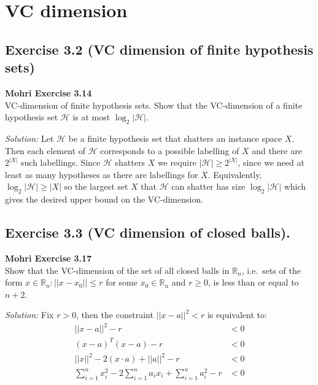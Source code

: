 \documentclass[
10pt, %
a4paper, %
oneside, %
headinclude,footinclude, %
BCOR5mm, %
]{scrartcl}
\newenvironment{problem}[2][]
               { \begin{mdframed}[backgroundcolor=gray!20] \textbf{#1 #2} \\}
               {  \end{mdframed}}
\newenvironment{solution}
               {\textit{Solution:}}
               {}
\begin{document}
\section{VC dimension}

\subsection*{Exercise 3.2 (VC dimension of finite hypothesis sets)}
\begin{problem}{Mohri Exercise 3.14}
VC-dimension of finite hypothesis sets. Show that the VC-dimension of a finite hypothesis set $\mathcal{H}$ is at most $\log_2|\mathcal{H}|$.
\end{problem}

\begin{solution}
  Let $\mathcal{H}$ be a finite hypothesis set that shatters an instance space $X$. Then each element of $\mathcal{H}$ corresponds to a possible labelling of $X$ and there are $2^{|X|}$ such labellings. Since $\mathcal{H}$ shatters $X$ we require $|\mathcal{H}| \geq 2^{|X|}$, since we need at least as many hypotheses as there are labellings for $X$. Equivalently, $\log_2{|\mathcal{H}|} \geq |X|$ so the largest set $X$ that $\mathcal{H}$ can shatter has size $\log_2 |\mathcal{H}|$ which gives the desired upper bound on the VC-dimension.
\end{solution}

\subsection*{Exercise 3.3 (VC dimension of closed balls).}
\begin{problem}{Mohri Exercise 3.17}
Show that the VC-dimension of the set of all closed balls in $\mathbb{R}_n$, i.e.\ sets of the form ${x \in \mathbb{R}_n : ||x-x_0|| \leq r}$ for some $x_0 \in \mathbb{R}_n$ and $r \geq 0$, is less than or equal to $n + 2$.
\end{problem}

\begin{solution}
Fix $r>0$, then the constraint $||x-a||^2<r$ is equivalent to:
\begin{align*}
  ||x-a||^2 - r &< 0 \\
  {(x-a)}^T(x-a) - r &< 0 \\
  ||x||^2 - 2(x\cdot a) + ||a||^2 - r &< 0 \\
  \sum_{i=1}^n x_i^2 - 2 \sum_{i=1}^n a_i x_i + \sum_{i=1}^n a_i^2 - r &< 0
\end{align*}
\end{solution}
\end{document}
